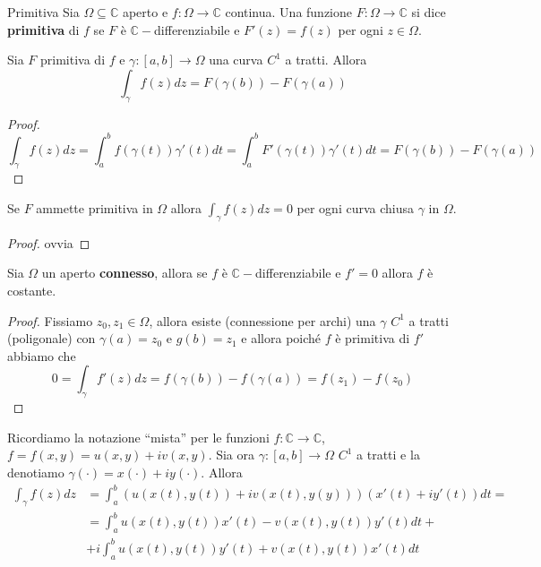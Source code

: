 \begin{definition}{Primitiva}
    Sia \(\Omega \subseteq \mathbb{C}\) aperto e \(f : \Omega \to \mathbb{C}\)
    continua. Una funzione \(F : \Omega \to \mathbb{C}\) si dice \textbf{primitiva} di
    \(f\) se \(F\) è \(\mathbb{C}-\)differenziabile e \(F'(z) = f(z)\) per ogni
    \(z \in \Omega\).
\end{definition}
\begin{proposition}
    Sia \(F\) primitiva di \(f\) e \(\gamma:[a,b] \to \Omega\) una curva
    \(C^{1}\) a tratti. Allora 
    \[
        \int_{\gamma} f(z) dz = F{(\gamma{(b)})} - F{(\gamma{(a)})}
    \]
\end{proposition}
\begin{proof}
    \[
        \int_{\gamma} f(z) dz = \int_{a}^{b} f{(\gamma{(t)})}\gamma'(t) dt =
        \int_{a}^{b} F'{(\gamma{(t)})}\gamma'(t) dt = F{(\gamma{(b)})} -
        F{(\gamma{(a)})}
    \]
\end{proof}
\begin{corollary}\label{cor:primitiva_zero}
    Se \(F\) ammette primitiva in \(\Omega\) allora \(\int_{\gamma} f(z) dz =
    0\) per ogni curva chiusa \(\gamma\) in \(\Omega\).
\end{corollary}
\begin{proof}
    ovvia
\end{proof}
\begin{corollary}
    Sia \(\Omega\) un aperto \textbf{connesso}, allora se \(f\) è
    \(\mathbb{C}-\)differenziabile e \(f'=0\) allora \(f\) è costante.
\end{corollary}
\begin{proof}
    Fissiamo \(z_{0}, z_{1} \in \Omega\), allora esiste (connessione per archi)
    una \(\gamma\) \(C^{1}\) a tratti (poligonale) con \(\gamma{(a)}=z_{0}\) e
    \(g{(b)}=z_{1}\) e allora poiché \(f\) è primitiva di \(f'\) abbiamo che 
    \[
        0 = \int_{\gamma} f'(z) dz = f{(\gamma{(b)})} - f{(\gamma{(a)})} =
        f(z_{1}) - f(z_{0})
    \]
\end{proof}
Ricordiamo la notazione ``mista'' per le funzioni \(f: \mathbb{C} \to
\mathbb{C}\), \(f = f(x, y) = u(x, y) + i v {(x, y)}\). Sia ora \(\gamma: [a,b]
\to \Omega\) \(C^{1}\) a tratti e la denotiamo \(\gamma(\cdot) = x{(\cdot )} +
iy(\cdot )\). Allora 
\begin{align*}
    \int_{\gamma} f(z) dz &= \int_{a}^{b} {\left( u(x(t), y(t)) + i v(x(t),y(y))
    \right)} (x'(t) + i y'(t))dt = \\
                          &= \int_{a}^{b} u(x(t), y(t)) x'(t) - v(x(t), y(t))
            y'(t) dt + \\ &+ i \int_{a}^{b} u(x(t), y(t)) y'(t) +
                          v(x(t), y(t)) x'(t) dt
\end{align*}
